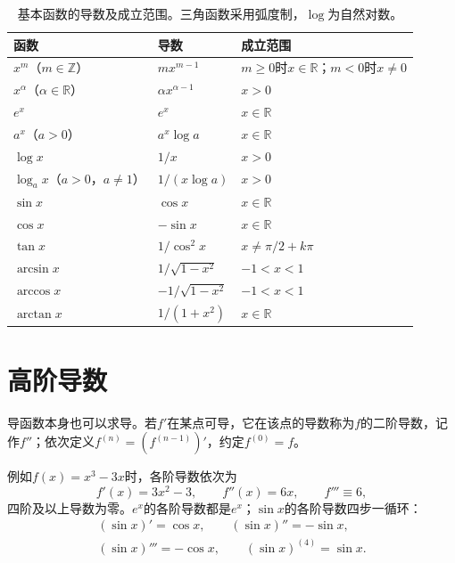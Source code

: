 \begin{table}[htbp]
 \centering\small
 \begin{tabular}{@{}lll@{}}
 \toprule
 函数 & 导数 & 成立范围\\
 \midrule
 $x^m$（$m\in\mathbb Z$） & $mx^{m-1}$ & $m\geq0$时$x\in\mathbb R$；$m<0$时$x\neq0$\\
 $x^\alpha$（$\alpha\in\mathbb R$） & $\alpha x^{\alpha-1}$ & $x>0$\\
 $e^x$ & $e^x$ & $x\in\mathbb R$\\
 $a^x$（$a>0$） & $a^x\log a$ & $x\in\mathbb R$\\
 $\log x$ & $1/x$ & $x>0$\\
 $\log_ax$（$a>0$，$a\neq1$） & $1/(x\log a)$ & $x>0$\\
 $\sin x$ & $\cos x$ & $x\in\mathbb R$\\
 $\cos x$ & $-\sin x$ & $x\in\mathbb R$\\
 $\tan x$ & $1/\cos^2x$ & $x\neq\pi/2+k\pi$\\
 $\arcsin x$ & $1/\sqrt{1-x^2}$ & $-1<x<1$\\
 $\arccos x$ & $-1/\sqrt{1-x^2}$ & $-1<x<1$\\
 $\arctan x$ & $1/(1+x^2)$ & $x\in\mathbb R$\\
 \bottomrule
 \end{tabular}
 \caption{基本函数的导数及成立范围。三角函数采用弧度制，$\log$为自然对数。}
 \label{tab:analysis-elementary-derivatives}
\end{table}
\section{高阶导数}
\label{sec:ru-higher-derivatives}

导函数本身也可以求导。若$f'$在某点可导，它在该点的导数称为$f$的二阶导数，记作$f''$；依次定义$f^{(n)}=(f^{(n-1)})'$，约定$f^{(0)}=f$。

例如$f(x)=x^3-3x$时，各阶导数依次为
\[
 f'(x)=3x^2-3,\qquad f''(x)=6x,\qquad f'''\equiv6,
\]
四阶及以上导数为零。$e^x$的各阶导数都是$e^x$；$\sin x$的各阶导数四步一循环：
\[
 \begin{gathered}
 (\sin x)'=\cos x,\qquad (\sin x)''=-\sin x,\\
 (\sin x)'''=-\cos x,\qquad (\sin x)^{(4)}=\sin x .
 \end{gathered}
\]

